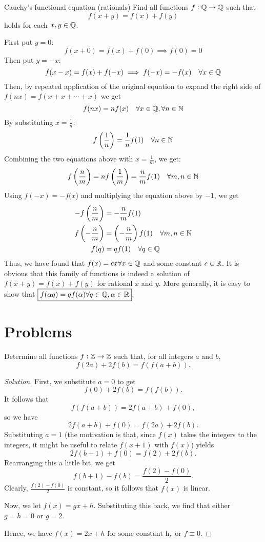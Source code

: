 \begin{exmp}{Cauchy's functional equation (rationals)}{}
Find all functions $f:\mathbb Q\to\mathbb Q$ such that
\[ f(x+y)=f(x)+f(y) \]
holds for each $x,y \in \mathbb Q$.
\end{exmp}
\begin{solution}
First put $y=0$:
\[ f(x+0) = f(x) + f(0) \implies f(0) = 0 \]
Then put $y=-x$:
\[ f(x-x) = f(x) + f(-x) \implies f(-x) = -f(x) \quad \forall x \in \mathbb Q \]
Then, by repeated application of the original equation to expand the right side of $f(nx) = f(x + x + \cdots + x)$ we get
\[ f(nx) = nf(x) \quad \forall x \in \mathbb Q, \forall n \in \mathbb N \]
By substituting $x=\frac{1}{n}$:
\[ f\left(\frac{1}{n}\right) = \frac{1}{n}f(1) \quad \forall n \in \mathbb N \]
Combining the two equations above with $x=\frac{1}{m}$, we get:
\[ f\left(\frac{n}{m}\right) = nf\left(\frac{1}{m}\right) = \frac{n}{m}f(1) \quad \forall m,n \in \mathbb N \]
Using $f(-x) = -f(x$) and multiplying the equation above by $-1$, we get
\begin{align*}
-f\left(\frac{n}{m}\right) &= -\frac{n}{m}f(1) \\
f\left(-\frac{n}{m}\right) &= \left(-\frac{n}{m}\right)f(1) \quad \forall m,n \in \mathbb N \\
f(q) &= qf(1) \quad \forall q \in \mathbb Q
\end{align*}
Thus, we have found that $f(x) = cx \forall x \in \mathbb Q$ and some constant $c \in \mathbb R$. It is obvious that this family of functions is indeed a solution of $f(x+y)=f(x)+f(y)$ for rational $x$ and $y$. More generally, it is easy to show that $\boxed{f(\alpha q) = qf(\alpha) \forall q \in \mathbb Q, \alpha \in \mathbb R}$.
\end{solution}
\pagebreak

\section*{Problems}
\begin{prbm}[IMO 2019]
Determine all functions $f: \mathbb Z \to \mathbb Z$ such that, for all integers $a$ and $b$, 
\[ f(2a)+2f(b)=f(f(a+b)).\]
\end{prbm}

\begin{proof}[Solution]
First, we substitute $a=0$ to get$$f(0) + 2f(b) = f(f(b)).$$It follows that$$f(f(a+b)) = 2f(a+b)+f(0),$$so we have$$2f(a+b)+f(0) = f(2a) + 2f(b).$$Substituting $a=1$ (the motivation is that, since $f(x)$ takes the integers to the integers, it might be useful to relate $f(x+1)$ with $f(x)$) yields$$2f(b+1) + f(0)=f(2)+2f(b).$$Rearranging this a little bit, we get$$f(b+1)-f(b) = \frac{f(2)-f(0)}{2}.$$Clearly, $\frac{f(2)-f(0)}{2}$ is constant, so it follows that $f(x)$ is linear.

Now, we let $f(x) = gx + h.$ Substituting this back, we find that either $g=h=0$ or $g=2.$

Hence, we have $\boxed{f(x) = 2x+h \text{ for some constant h}},$ or $\boxed{f \equiv 0}.$
\end{proof}
\pagebreak

